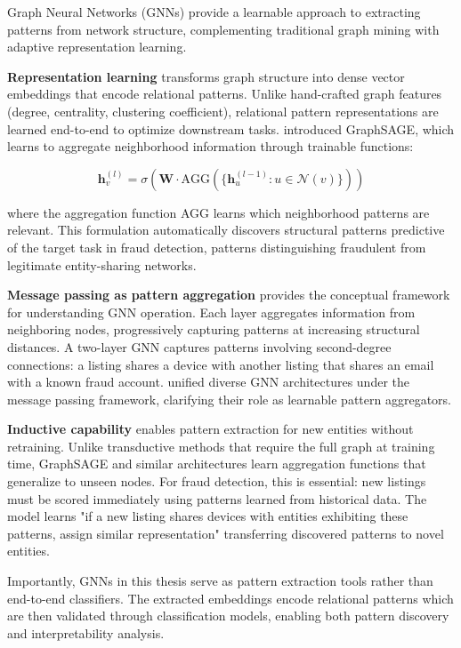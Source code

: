Graph Neural Networks (GNNs) provide a learnable approach to extracting patterns from network structure, complementing traditional graph mining with adaptive representation learning.

\textbf{Representation learning} transforms graph structure into dense vector embeddings that encode relational patterns. Unlike hand-crafted graph features (degree, centrality, clustering coefficient), relational pattern representations are learned end-to-end to optimize downstream tasks. \citeauthor{hamilton2017inductive} \cite{hamilton2017inductive} introduced GraphSAGE, which learns to aggregate neighborhood information through trainable functions:

\begin{equation}
\mathbf{h}_v^{(l)} = \sigma\left(\mathbf{W} \cdot \text{AGG}\left(\{\mathbf{h}_u^{(l-1)} : u \in \mathcal{N}(v)\}\right)\right)
\end{equation}

where the aggregation function AGG learns which neighborhood patterns are relevant. This formulation automatically discovers structural patterns predictive of the target task in fraud detection, patterns distinguishing fraudulent from legitimate entity-sharing networks.

\textbf{Message passing as pattern aggregation} provides the conceptual framework for understanding GNN operation. Each layer aggregates information from neighboring nodes, progressively capturing patterns at increasing structural distances. A two-layer GNN captures patterns involving second-degree connections: a listing shares a device with another listing that shares an email with a known fraud account. \citeauthor{gilmer2017neural} \cite{gilmer2017neural} unified diverse GNN architectures under the message passing framework, clarifying their role as learnable pattern aggregators.

\textbf{Inductive capability} enables pattern extraction for new entities without retraining. Unlike transductive methods that require the full graph at training time, GraphSAGE and similar architectures learn aggregation functions that generalize to unseen nodes. For fraud detection, this is essential: new listings must be scored immediately using patterns learned from historical data. The model learns "if a new listing shares devices with entities exhibiting these patterns, assign similar representation" transferring discovered patterns to novel entities.

Importantly, GNNs in this thesis serve as pattern extraction tools rather than end-to-end classifiers. The extracted embeddings encode relational patterns which are then validated through classification models, enabling both pattern discovery and interpretability analysis.
